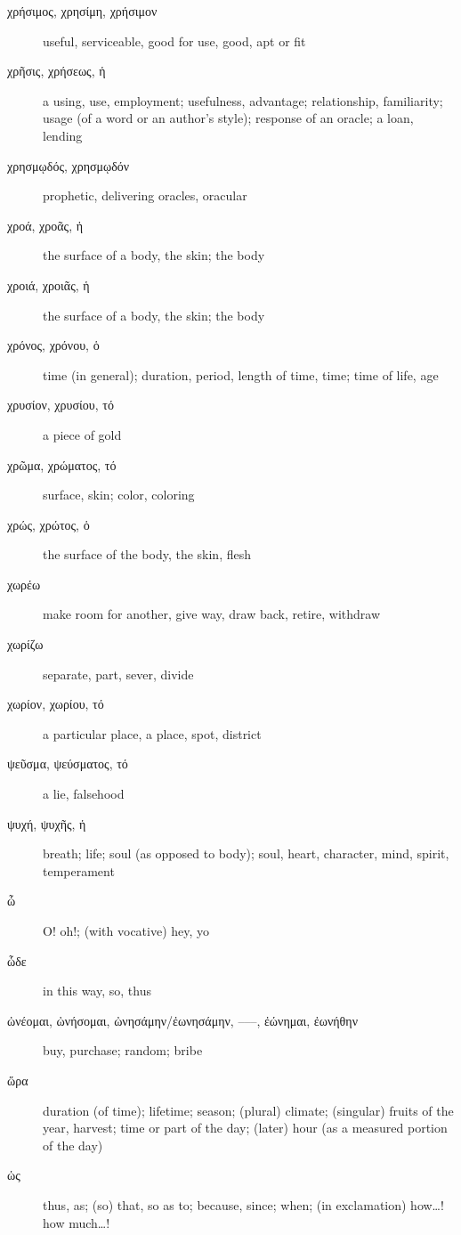 \documentclass[12pt,letterpaper]{article}
\begin{document}
\begin{description}
    \item[\textgreek{χρήσιμος, χρησίμη, χρήσιμον}] \marginnote{*}useful, serviceable, good for use, good, apt or fit
    \item[\textgreek{χρῆσις, χρήσεως, ἡ}] a using, use, employment; usefulness, advantage; relationship, familiarity; usage (of a word or an author's style); response of an oracle; a loan, lending
    \item[\textgreek{χρησμῳδός, χρησμῳδόν}] prophetic, delivering oracles, oracular
    \item[\textgreek{χροά, χροᾶς, ἡ}] the surface of a body, the skin; the body
    \item[\textgreek{χροιά, χροιᾶς, ἡ}] the surface of a body, the skin; the body
    \item[\textgreek{χρόνος, χρόνου, ὁ}] \marginnote{*}time (in general); duration, period, length of time, time; time of life, age
    \item[\textgreek{χρυσίον, χρυσίου, τό}] a piece of gold
    \item[\textgreek{χρῶμα, χρώματος, τό}] surface, skin; color, coloring
    \item[\textgreek{χρώς, χρώτος, ὁ}] the surface of the body, the skin, flesh
    \item[\textgreek{χωρέω}] make room for another, give way, draw back, retire, withdraw
    \item[\textgreek{χωρίζω}] separate, part, sever, divide
    \item[\textgreek{χωρίον, χωρίου, τό}] a particular place, a place, spot, district
    \item[\textgreek{ψεῦσμα, ψεύσματος, τό}] a lie, falsehood
    \item[\textgreek{ψυχή, ψυχῆς, ἡ}] \marginnote{*}breath; life; soul (as opposed to body); soul, heart, character, mind, spirit, temperament
    \item[\textgreek{ὦ}] \marginnote{*}O! oh!; (with vocative) hey, yo
    \item[\textgreek{ὧδε}] \marginnote{*}in this way, so, thus
    \item[\textgreek{ὠνέομαι, ὠνήσομαι, ὠνησάμην/ἐωνησάμην, –––, ἐώνημαι, ἐωνήθην}] buy, purchase; random; bribe
    \item[\textgreek{ὥρα}] duration (of time); lifetime; season; (plural) climate; (singular) fruits of the year, harvest; time or part of the day; (later) hour (as a measured portion of the day)
    \item[\textgreek{ὡς}] \marginnote{*}thus, as; (so) that, so as to; because, since; when; (in exclamation) how\dots ! how much\dots !

\end{description}
\end{document}
